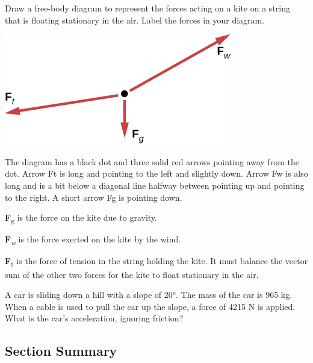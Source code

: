 \documentclass[
]{book}
\newenvironment{ap-test-prep}{}{}
\begin{document}
\begin{ap-test-prep}
\hypertarget{fs-id2298446}{}
\leavevmode\hypertarget{fs-id2298449}{}%
Draw a free-body diagram to represent the forces acting on a kite on a
string that is floating stationary in the air. Label the forces in your
diagram.

\leavevmode\hypertarget{fs-id1694546}{}%
\includegraphics{images/Figure_04_05_13.jpg}

The diagram has a black dot and three solid red arrows pointing away
from the dot. Arrow Ft is long and pointing to the left and slightly
down. Arrow Fw is also long and is a bit below a diagonal line halfway
between pointing up and pointing to the right. A short arrow Fg is
pointing down.

\textbf{F}\textsubscript{g} is the force on the kite due to gravity.

\textbf{F}\textsubscript{\emph{w}} is the force exerted on the kite by the wind.

\textbf{F}\textsubscript{t} is the force of tension in the string holding the kite. It must
balance the vector sum of the other two forces for the kite to float
stationary in the air.

\hypertarget{fs-id2154704}{}
\leavevmode\hypertarget{fs-id2244827}{}%
A car is sliding down a hill with a slope of 20°. The mass of the car is
965 kg. When a cable is used to pull the car up the slope, a force of
4215 N is applied. What is the car's acceleration, ignoring friction?

\end{ap-test-prep}

\hypertarget{fs-id2352878-summary}{}
\hypertarget{section-summary-12}{%
\subsection{Section Summary}\label{section-summary-12}}
\end{document}
